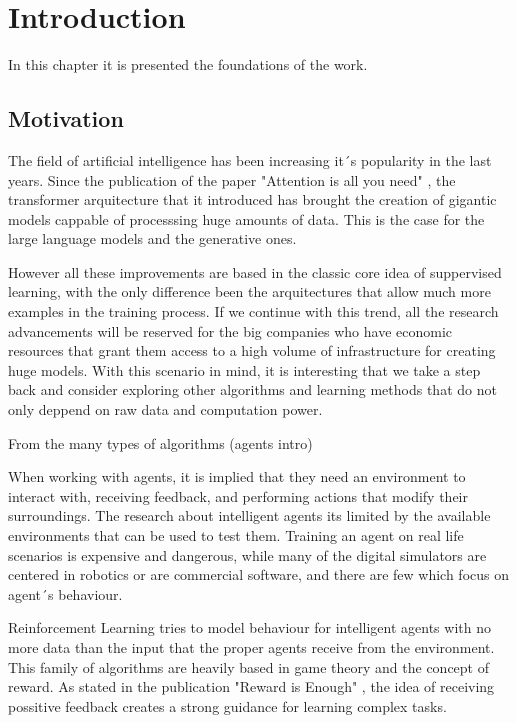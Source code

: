 \chapter{Introduction}

In this chapter it is presented the foundations of the work. 

\section{Motivation}

The field of artificial intelligence has been increasing it´s popularity in the last years. Since the publication of the paper "Attention is all you need" \cite{attention}, the transformer arquitecture that it introduced has brought the creation of gigantic models cappable of processsing huge amounts of data. This is the case for the large language models and the generative ones.

However all these improvements are based in the classic core idea of suppervised learning, with the only difference been the arquitectures that allow much more examples in the training process. If we continue with this trend, all the research advancements will be reserved for the big companies who have economic resources that grant them access to a high volume of infrastructure for creating huge models. With this scenario in mind, it is interesting that we take a step back and consider exploring other algorithms and learning methods that do not only deppend on raw data and computation power.

From the many types of algorithms (agents intro)

When working with agents, it is implied that they need an environment to interact with, receiving feedback, and performing actions that modify their surroundings. The research about intelligent agents its limited by the available environments that can be used to test them. Training an agent on real life scenarios is expensive and dangerous, while many of the digital simulators are centered in robotics or are commercial software, and there are few which focus on agent´s behaviour.

Reinforcement Learning tries to model behaviour for intelligent agents with no more data than the input that the proper agents receive from the environment. This family of algorithms are heavily based in game theory and the concept of reward. As stated in the publication "Reward is Enough"  \cite{rewardIsEnough}, the idea of receiving possitive feedback creates a strong guidance for learning complex tasks.

